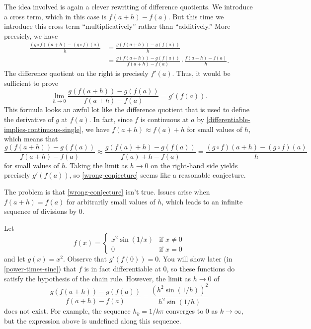 The idea involved is again a clever rewriting of difference quotients. We introduce a cross term, which in this case is $f(a+h) - f(a)$. But this time we introduce this cross term ``multiplicatively'' rather than ``additively.'' More precsiely, we have
\[ \begin{aligned} \frac{(g \circ f)(a+h) - (g \circ f)(a)}{h} &= \frac{g(f(a+h)) - g(f(a))}{h} \\ &= \frac{g(f(a+h)) - g(f(a))}{f(a+h)-f(a)} \cdot \frac{f(a+h)-f(a)}{h}. \end{aligned} \]
The difference quotient on the right is precisely $f'(a)$. Thus, it would be sufficient to prove  
\begin{equation} \label{wrong-conjecture} \lim_{h \to 0} \frac{g(f(a+h)) - g(f(a))}{f(a+h)-f(a)} = g'(f(a)). \end{equation}
This formula looks an awful lot like the difference quotient that is used to define the derivative of $g$ at $f(a)$. In fact, since $f$ is continuous at $a$ by \cref{differentiable-implies-continuous-single}, we have $f(a+h) \approx f(a)+h$ for small values of $h$, which means that
\[ \frac{g(f(a+h)) - g(f(a))}{f(a+h)-f(a)} \approx \frac{g(f(a)+h) - g(f(a))}{f(a)+h-f(a)} = \frac{(g \circ f)(a+h) - (g\circ f)(a)}{h} \]
for small values of $h$. Taking the limit as $h \to 0$ on the right-hand side yields precisely $g'(f(a))$, so \cref{wrong-conjecture} seems like a reasonable conjecture. 

The problem is that \cref{wrong-conjecture} isn't true. Issues arise when $f(a+h) = f(a)$ for arbitrarily small values of $h$, which leads to an infinite sequence of divisions by 0. 

\begin{example} \label{wrong-conjecture-counterexample}
	Let \[ f(x) = \begin{cases} x^2\sin(1/x) & \text{if } x \neq 0 \\ 0 & \text{if } x = 0 \end{cases} \] and let $g(x) = x^2$. Observe that $g'(f(0)) = 0$. You will show later (in \cref{power-times-sine}) that $f$ is in fact differentiable at 0, so these functions do satisfy the hypothesis of the chain rule. However, the limit as $h \to 0$ of
	\[ \frac{g(f(a+h)) - g(f(a))}{f(a+h)-f(a)} = \frac{(h^2\sin(1/h))^2}{h^2\sin(1/h)} \]
	does not exist. For example, the sequence $h_k = 1/k\pi$ converges to 0 as $k \to \infty$, but the expression above is undefined along this sequence. 
\end{example}

